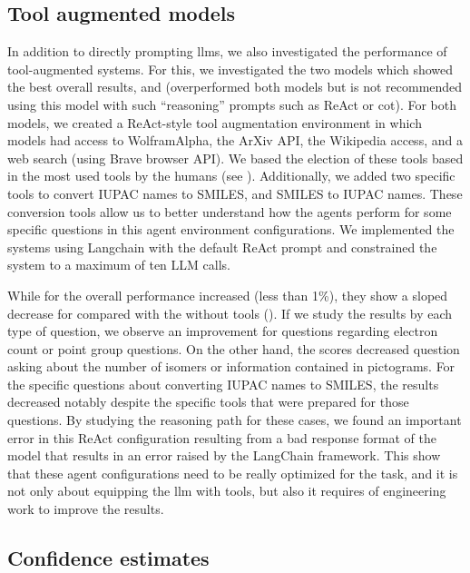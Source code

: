 \clearpage
\subsection{Tool augmented models} \label{sec:react-environment}
In addition to directly prompting \glspl{llm}, we also investigated the performance of tool-augmented systems.
For this, we investigated the two models which showed the best overall results, \GPTFourO and \ClaudeThreeFiveSonnet (\oone overperformed both models but is not recommended using this model with such \enquote{reasoning} prompts such as ReAct\autocite{yao2022react} or \gls{cot}\autocite{wei2023cot}). 
For both models, we created a ReAct-style tool augmentation environment in which models had access to WolframAlpha, the ArXiv API, the Wikipedia access, and a web search (using Brave browser API).
We based the election of these tools based in the most used tools by the humans (see ).
Additionally, we added two specific tools to convert IUPAC names to SMILES, and SMILES to IUPAC names.
These conversion tools allow us to better understand how the agents perform for some specific questions in this agent environment configurations.
We implemented the systems using Langchain with the default ReAct prompt and constrained the system to a maximum of ten LLM calls.

While for \ClaudeThreeFiveSonnet the overall performance increased (less than 1\%), they show a sloped decrease for \GPTFourO compared with the \llm without tools (). 
If we study the results by each type of question, we observe an improvement for questions regarding electron count or point group questions.
On the other hand, the scores decreased question asking about the number of isomers or information contained in pictograms.
For the specific questions about converting IUPAC names to SMILES, the results decreased notably despite the specific tools that were prepared for those questions. 
By studying the reasoning path for these cases, we found an important error in this ReAct configuration resulting from a bad response format of the model that results in an error raised by the LangChain framework.
This show that these agent configurations need to be really optimized for the task, and it is not only about equipping the \gls{llm} with tools, but also it requires of engineering work to improve the results.


\clearpage
\subsection{Confidence estimates} \label{sec:confidence_estimates}

